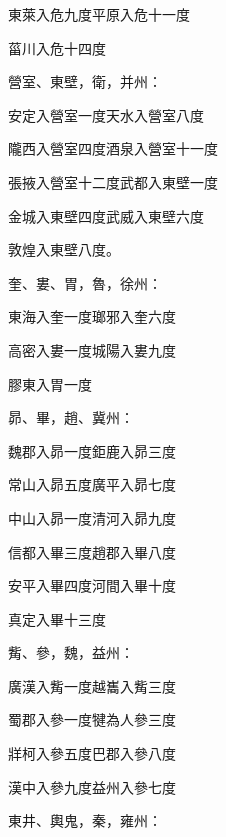 \begin{pinyinscope}
{{ 東萊入危九度平原入危十一度



 菑川入危十四度



 營室、東壁，衛，并州：



 安定入營室一度天水入營室八度



 隴西入營室四度酒泉入營室十一度



 張掖入營室十二度武都入東壁一度



 金城入東壁四度武威入東壁六度



 敦煌入東壁八度。



 奎、婁、胃，魯，徐州：



 東海入奎一度瑯邪入奎六度



 高密入婁一度城陽入婁九度



 膠東入胃一度



 昴、畢，趙、冀州：



 魏郡入昴一度鉅鹿入昴三度



 常山入昴五度廣平入昴七度



 中山入昴一度清河入昴九度



 信都入畢三度趙郡入畢八度



 安平入畢四度河間入畢十度



 真定入畢十三度



 觜、參，魏，益州：



 廣漢入觜一度越巂入觜三度



 蜀郡入參一度犍為人參三度



 牂柯入參五度巴郡入參八度



 漢中入參九度益州入參七度



 東井、輿鬼，秦，雍州：



}}
\end{pinyinscope}
